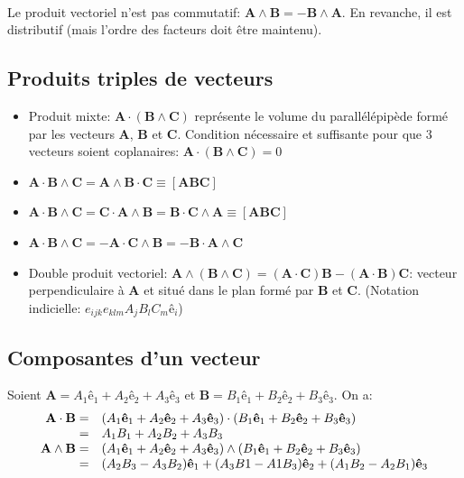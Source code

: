 \paragraph{}
Le produit vectoriel n'est pas commutatif: $\textbf{A}\wedge\textbf{B} = -\textbf{B}\wedge\textbf{A}$. En revanche, il est distributif (mais l'ordre des facteurs doit être maintenu).

\subsection{Produits triples de vecteurs}
\begin{itemize}
\item Produit mixte: $\textbf{A}\cdot(\textbf{B}\wedge\textbf{C})$ représente le volume du parallélépipède formé par les vecteurs \textbf{A}, \textbf{B} et \textbf{C}. Condition nécessaire et suffisante pour que 3 vecteurs soient coplanaires: $\textbf{A}\cdot(\textbf{B}\wedge\textbf{C})=0$ 
\item $\textbf{A}\cdot\textbf{B}\wedge\textbf{C}=\textbf{A}\wedge\textbf{B}\cdot\textbf{C}\equiv[\textbf{ABC}]$ 
\item $\textbf{A}\cdot \textbf{B}\wedge\textbf{C} = \textbf{C}\cdot\textbf{A}\wedge\textbf{B}=\textbf{B}\cdot\textbf{C}\wedge\textbf{A}\equiv[\textbf{ABC}]$
\item $\textbf{A}\cdot \textbf{B}\wedge\textbf{C} = -\textbf{A}\cdot\textbf{C}\wedge\textbf{B}=-\textbf{B}\cdot\textbf{A}\wedge\textbf{C}$
\item Double produit vectoriel: $\textbf{A}\wedge(\textbf{B}\wedge\textbf{C})=(\textbf{A}\cdot\textbf{C})\textbf{B}-(\textbf{A}\cdot\textbf{B})\textbf{C}$: vecteur perpendiculaire à \textbf{A} et situé dans le plan formé par \textbf{B} et \textbf{C}. (Notation indicielle: $e_{ijk}e_{klm}A_jB_lC_m\textbf{ê}_i$)
\end{itemize}

\subsection{Composantes d'un vecteur}

Soient $\textbf{A}=A_1\textbf{ê}_1+A_2\textbf{ê}_2+A_3\textbf{ê}_3$ et $\textbf{B}=B_1\textbf{ê}_1+B_2\textbf{ê}_2+B_3\textbf{ê}_3$. On a:
$$\begin{array}{r l}
\textbf{A}\cdot\textbf{B} =&(A_1 \textbf{ê}_1+A_2\textbf{ê}_2+A_3\textbf{ê}_3)\cdot(B_1\textbf{ê}_1+B_2\textbf{ê}_2+B_3\textbf{ê}_3)\\
 =&A_1B_1 + A_2B_2+A_3B_3\\
\textbf{A}\wedge\textbf{B}=&(A_1 \textbf{ê}_1+A_2\textbf{ê}_2+A_3\textbf{ê}_3)\wedge(B_1\textbf{ê}_1+B_2\textbf{ê}_2+B_3\textbf{ê}_3)\\
 =&(A_2B_3-A_3B_2)\textbf{ê}_1+(A_3B1-A1B_3)\textbf{ê}_2+(A_1B_2-A_2B_1)\textbf{ê}_3\\
\end{array}$$

